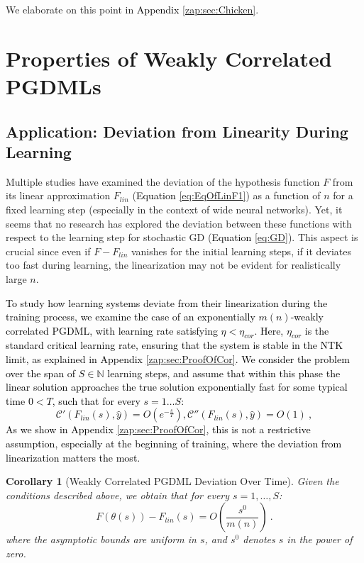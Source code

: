 \documentclass{article} %
\newtheorem{corollary}{Corollary}[section]
\begin{document}
We elaborate on this point in \textcolor{black}{Appendix} \ref{zap:sec:Chicken}.

\section{Properties of Weakly Correlated PGDMLs}
\label{sec:PropWeakCorPGDML}

\subsection{Application: Deviation from Linearity During Learning}
\label{sec:ApliDevFromLinTime}

Multiple studies have examined the deviation of the hypothesis function \(F\) from its linear approximation \(F_{lin}\) (\textcolor{black}{Equation} \ref{eq:EqOfLinF1}) as a function of \(n\) for a fixed learning step (especially in the context of wide neural networks). Yet, it seems that no research has explored the deviation between these functions with respect to the learning step for stochastic GD (\textcolor{black}{Equation} \ref{eq:GD}). This aspect is crucial since even if \(F-F_{lin}\) vanishes for the initial learning steps, if it deviates too fast during learning, the linearization may not be evident for realistically large \(n\).

\textcolor{black}{To study how learning systems deviate from their linearization during the training process, we examine the case of an exponentially \(m(n)\)-weakly correlated PGDML, with learning rate satisfying $\eta<\eta_{cor}$. Here, $\eta_{cor}$ is the standard critical learning rate, ensuring that the system \textcolor{black}{is} stable in the NTK limit, as explained in Appendix \ref{zap:sec:ProofOfCor}. We consider the problem over the span of $S\in\mathbb{N}$ learning steps, and assume that within this phase the linear solution approaches the true solution exponentially fast for some typical time $0<T$, such that for every $s=1\ldots S$:
\begin{equation}
\mathcal{C}'\left(F_{lin}\left(s\right),\hat{y}\right)=O\left(e^{-\frac{s}{T}}\right),\mathcal{C}''\left(F_{lin}\left(s\right),\hat{y}\right)=O\left(1\right) \ ,
\end{equation}
As we show in Appendix \ref{zap:sec:ProofOfCor}, this is not a restrictive assumption, especially at the beginning of training, where the deviation from linearization matters the most.}

\begin{corollary}[Weakly Correlated PGDML Deviation Over Time]
\label{cor:LowCorDevLin1}
\textup{Given the conditions described above, we obtain that for every $s = 1,\ldots,S$:
\begin{equation}
F\left(\theta\left(s\right)\right)-F_{lin}\left(s\right)= O\left(\frac{s^{0}}{m\left(n\right)}\right) \ .
\end{equation}
where the asymptotic bounds are uniform in $s$, and $s^0$ denotes $s$ in the power of zero.
}
\end{corollary}
\end{document}
